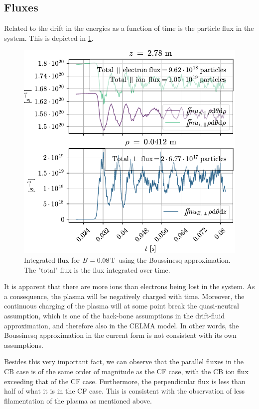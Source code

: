 \subsection{Fluxes}
%
Related to the drift in the energies as a function of time is the particle flux in the system.
This is depicted in \cref{fig:fluxB0008}.
%
\begin{figure}[htb]
    \centering
    \includegraphics{fig/results/compareBouss/flux008B}
    \caption{Integrated flux for $B=0.08\, \text{T}$ using the Boussinesq approximation.
        The "total" flux is the flux integrated over time.}
    \label{fig:fluxB0008}
\end{figure}
%
It is apparent that there are more ions than electrons being lost in the system.
As a consequence, the plasma will be negatively charged with time.
Moreover, the continuous charging of the plasma will at some point break the quasi-neutral assumption, which is one of the back-bone assumptions in the drift-fluid approximation, and therefore also in the CELMA model.
In other words, the Boussinesq approximation in the current form is not consistent with its own assumptions.

Besides this very important fact, we can observe that the parallel fluxes in the CB case is of the same order of magnitude as the CF case, with the CB ion flux exceeding that of the CF case.
Furthermore, the perpendicular flux is less than half of what it is in the CF case.
This is consistent with the observation of less filamentation of the plasma as mentioned above.


